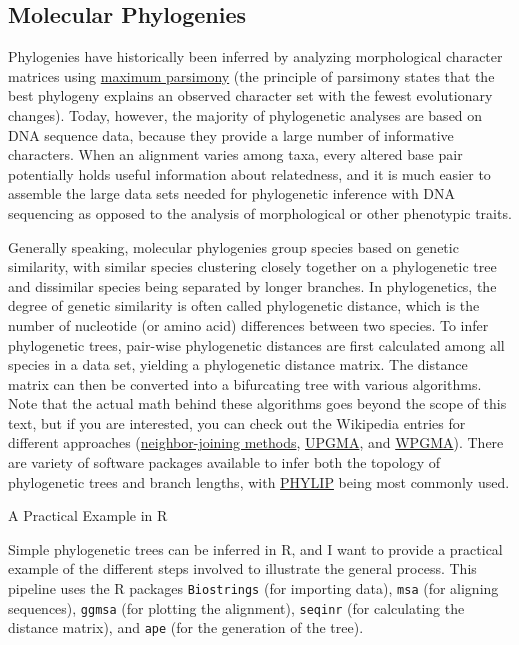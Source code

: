 \documentclass[
]{book}
\begin{document}
\hypertarget{molecular-phylogenies}{%
\subsection{Molecular Phylogenies}\label{molecular-phylogenies}}

Phylogenies have historically been inferred by analyzing morphological character matrices using \href{https://en.wikipedia.org/wiki/Maximum_parsimony_(phylogenetics)}{maximum parsimony} (the principle of parsimony states that the best phylogeny explains an observed character set with the fewest evolutionary changes). Today, however, the majority of phylogenetic analyses are based on DNA sequence data, because they provide a large number of informative characters. When an alignment varies among taxa, every altered base pair potentially holds useful information about relatedness, and it is much easier to assemble the large data sets needed for phylogenetic inference with DNA sequencing as opposed to the analysis of morphological or other phenotypic traits.

Generally speaking, molecular phylogenies group species based on genetic similarity, with similar species clustering closely together on a phylogenetic tree and dissimilar species being separated by longer branches. In phylogenetics, the degree of genetic similarity is often called phylogenetic distance, which is the number of nucleotide (or amino acid) differences between two species. To infer phylogenetic trees, pair-wise phylogenetic distances are first calculated among all species in a data set, yielding a phylogenetic distance matrix. The distance matrix can then be converted into a bifurcating tree with various algorithms. Note that the actual math behind these algorithms goes beyond the scope of this text, but if you are interested, you can check out the Wikipedia entries for different approaches (\href{https://en.wikipedia.org/wiki/Neighbor_joining}{neighbor-joining methods}, \href{https://en.wikipedia.org/wiki/UPGMA}{UPGMA}, and \href{https://en.wikipedia.org/wiki/WPGMA}{WPGMA}). There are variety of software packages available to infer both the topology of phylogenetic trees and branch lengths, with \href{https://evolution.genetics.washington.edu/phylip.html}{PHYLIP} being most commonly used.

A Practical Example in R

Simple phylogenetic trees can be inferred in R, and I want to provide a practical example of the different steps involved to illustrate the general process. This pipeline uses the R packages \texttt{Biostrings} (for importing data), \texttt{msa} (for aligning sequences), \texttt{ggmsa} (for plotting the alignment), \texttt{seqinr} (for calculating the distance matrix), and \texttt{ape} (for the generation of the tree).
\end{document}
